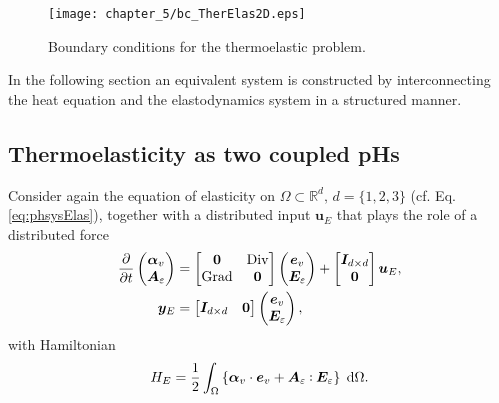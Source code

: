 \begin{figure}[tb]
	\centering
	\texttt{[image: chapter\_5/bc\_TherElas2D.eps]}
	\caption{Boundary conditions for the thermoelastic problem.}
	\label{fig:bc_TherElas2D}
\end{figure}
In the following section an equivalent system is constructed by interconnecting the heat equation and the elastodynamics system in a structured manner.

\subsection{Thermoelasticity as two coupled pHs}

Consider again the equation of elasticity on $\Omega \subset \mathbb{R}^d, \, d =\{1, 2, 3\}$ (cf. Eq. \eqref{eq:phsysElas}), together with a distributed input $\bm{u}_E$ that plays the role of a distributed force
\begin{equation}
\begin{aligned}
\diffp{}{t}
\begin{pmatrix}
\bm{\alpha}_v \\
\bm{A}_{\varepsilon} \\
\end{pmatrix} &= 
\begin{bmatrix}
\bm{0} & \Div \\
\Grad & \bm{0} \\
\end{bmatrix}
\begin{pmatrix}
\bm{e}_v \\
\bm{E}_{\varepsilon} \\
\end{pmatrix} + 
\begin{bmatrix}
\bm{I}_{d\times d} \\
\bm{0} \\
\end{bmatrix}\bm{u}_E, \\
\bm{y}_E &= \begin{bmatrix}
\bm{I}_{d\times d} & \bm{0} \\
\end{bmatrix}
\begin{pmatrix}
\bm{e}_v \\
\bm{E}_{\varepsilon}
\end{pmatrix},
\end{aligned}
\end{equation}
with Hamiltonian  
\[
H_E = \energy{\bm{\alpha}_v \cdot \bm{e}_v + \bm{A}_{\varepsilon} \cddot \bm{E}_{\varepsilon}}.
\]
